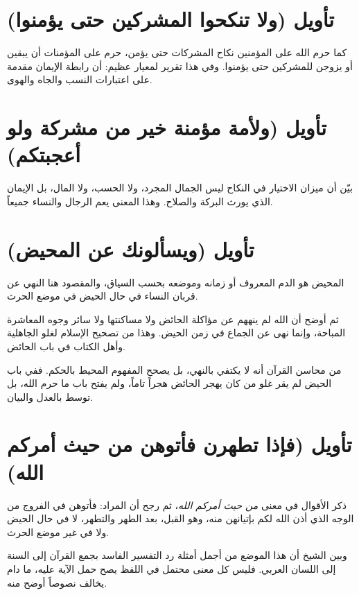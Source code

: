 \separator

\section{تأويل (ولا تنكحوا المشركين حتى يؤمنوا)}
كما حرم الله على المؤمنين نكاح المشركات حتى يؤمن، حرم على المؤمنات أن يبقين أو يزوجن للمشركين حتى يؤمنوا. وفي هذا تقرير لمعيار عظيم: أن رابطة الإيمان مقدمة على اعتبارات النسب والجاه والهوى.

\section{تأويل (ولأمة مؤمنة خير من مشركة ولو أعجبتكم)}
بيّن  أن ميزان الاختيار في النكاح ليس الجمال المجرد، ولا الحسب، ولا المال، بل الإيمان الذي يورث البركة والصلاح. وهذا المعنى يعم الرجال والنساء جميعاً.

\separator

\section{تأويل (ويسألونك عن المحيض)}
 المحيض هو الدم المعروف أو زمانه وموضعه بحسب السياق، والمقصود هنا النهي عن قربان النساء في حال الحيض في موضع الحرث.

ثم أوضح  أن الله لم ينههم عن مؤاكلة الحائض ولا مساكنتها ولا سائر وجوه المعاشرة المباحة، وإنما نهى عن الجماع في زمن الحيض. وهذا من تصحيح الإسلام لغلو الجاهلية وأهل الكتاب في باب الحائض.

\begin{fawaid}
من محاسن القرآن أنه لا يكتفي بالنهي، بل يصحح المفهوم المحيط بالحكم. ففي باب الحيض لم يقر غلو من كان يهجر الحائض هجراً تاماً، ولم يفتح باب ما حرم الله، بل توسط بالعدل والبيان.
\end{fawaid}

\section{تأويل (فإذا تطهرن فأتوهن من حيث أمركم الله)}
ذكر  الأقوال في معنى \textit{من حيث أمركم الله}، ثم رجح أن المراد: فأتوهن في الفروج من الوجه الذي أذن الله لكم بإتيانهن منه، وهو القبل، بعد الطهر والتطهر، لا في حال الحيض ولا في غير موضع الحرث.

وبين الشيخ أن هذا الموضع من أجمل أمثلة رد التفسير الفاسد بجمع القرآن إلى السنة إلى اللسان العربي. فليس كل معنى محتمل في اللفظ يصح حمل الآية عليه، ما دام يخالف نصوصاً أوضح منه.

